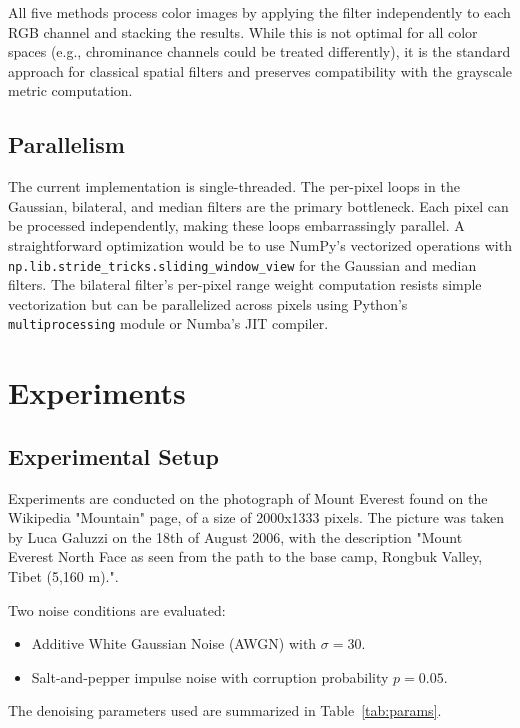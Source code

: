 \documentclass[conference]{IEEEtran}
\begin{document}
All five methods process color images by applying the filter independently to each RGB channel and stacking the results. While this is not optimal for all color spaces (e.g., chrominance channels could be treated differently), it is the standard approach for classical spatial filters and preserves compatibility with the grayscale metric computation.

\subsection{Parallelism}

The current implementation is single-threaded. The per-pixel loops in the Gaussian, bilateral, and median filters are the primary bottleneck. Each pixel can be processed independently, making these loops embarrassingly parallel. A straightforward optimization would be to use NumPy's vectorized operations with \texttt{np.lib.stride\_tricks.sliding\_window\_view} for the Gaussian and median filters. The bilateral filter's per-pixel range weight computation resists simple vectorization but can be parallelized across pixels using Python's \texttt{multiprocessing} module or Numba's JIT compiler.

\section{Experiments}

\subsection{Experimental Setup}

Experiments are conducted on the photograph of Mount Everest found on the Wikipedia "Mountain" page, of a size of 2000x1333 pixels. The picture was taken by Luca Galuzzi on the 18th of August 2006, with the description "Mount Everest North Face as seen from the path to the base camp, Rongbuk Valley, Tibet (5,160 m).".

Two noise conditions are evaluated:
\begin{itemize}
  \item Additive White Gaussian Noise (AWGN) with $\sigma = 30$.
  \item Salt-and-pepper impulse noise with corruption probability $p = 0.05$.
\end{itemize}

The denoising parameters used are summarized in Table~\ref{tab:params}.
\end{document}
